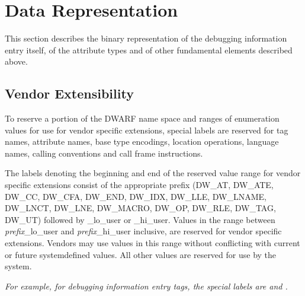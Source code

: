 \chapter{Data Representation}
\label{datarep:datarepresentation}

This section describes the binary representation of the
debugging information entry itself, of the attribute types
and of other fundamental elements described above.

\section{Vendor Extensibility}
\label{datarep:vendorextensibility}

To 
reserve a portion of the DWARF name space and ranges of
enumeration values for use for vendor specific extensions,
special labels are reserved for tag names, attribute names,
base type encodings, location operations, language names,
calling conventions and call frame instructions.

The labels denoting the beginning and end of the 
\hypertarget{chap:DWXXXlohiuser}{reserved value range}
for vendor specific extensions consist of the
appropriate prefix 
(\DWATlouserMARK{}\DWAThiuserMARK{}DW\_AT, 
\DWATElouserMARK{}\DWATEhiuserMARK{}DW\_ATE, 
\DWCClouserMARK{}\DWCChiuserMARK{}DW\_CC, 
\DWCFAlouserMARK{}\DWCFAhiuserMARK{}DW\_CFA, 
\DWENDlouserMARK{}\DWENDhiuserMARK{}DW\_END, 
\DWIDXlouserMARK{}\DWIDXhiuserMARK{}DW\_IDX, 
\bb
\DWLLElouserMARK{}\DWLLEhiuserMARK{}DW\_LLE,
\DWLNAMElouserMARK{}\DWLNAMEhiuserMARK{}DW\_LNAME,
\eb 
\DWLNCTlouserMARK{}\DWLNCThiuserMARK{}DW\_LNCT, 
\DWLNElouserMARK{}\DWLNEhiuserMARK{}DW\_LNE, 
\DWMACROlouserMARK{}\DWMACROhiuserMARK{}DW\_MACRO,
\DWOPlouserMARK{}\DWOPhiuserMARK{}DW\_OP,
\bb
\DWRLElouserMARK{}\DWRLEhiuserMARK{}DW\_RLE,
\eb
\DWTAGlouserMARK{}\DWTAGhiuserMARK{}DW\_TAG,
\DWUTlouserMARK{}\DWUThiuserMARK{}DW\_UT)
followed by \_lo\_user or \_hi\_user. 
Values in the  range between \textit{prefix}\_lo\_user 
and \textit{prefix}\_hi\_user inclusive,
are reserved for vendor specific extensions. Vendors may
use values in this range without conflicting with current or
future system\dash defined values. All other values are reserved
for use by the system.

\textit{For example, for debugging information entry
tags, the special labels are \DWTAGlouserNAME{} and \DWTAGhiuserNAME.}

